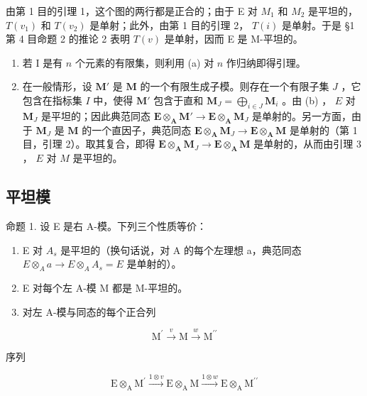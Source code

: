 由第 1 目的引理 1，这个图的两行都是正合的；由于 E 对 \(M_{1}\) 和 \(M_{2}\) 是平坦的， \(T(v_{1})\) 和 \(T(v_{2})\) 是单射；此外，由第 1 目的引理 2， \(T(i)\) 是单射。于是 §1 第 4 目命题 2 的推论 2 表明 \(T(v)\) 是单射，因而 E 是 M-平坦的。

\begin{enumerate}
\def\labelenumi{(\alph{enumi})}
\setcounter{enumi}{1}
\item
  若 I 是有 \(n\) 个元素的有限集，则利用 (a) 对 \(n\) 作归纳即得引理。
\item
  在一般情形，设 \(\mathbf{M}'\) 是 \(\mathbf{M}\) 的一个有限生成子模。则存在一个有限子集 \(J\) ，它包含在指标集 \(I\) 中，使得 \(\mathbf{M}'\) 包含于直和 \(\mathbf{M}_J = \bigoplus_{i \in J} \mathbf{M}_i\) 。由 (b) ， \(E\) 对 \(\mathbf{M}_J\) 是平坦的；因此典范同态 \(\mathbf{E} \otimes_{\mathbf{A}} \mathbf{M}' \to \mathbf{E} \otimes_{\mathbf{A}} \mathbf{M}_J\) 是单射的。另一方面，由于 \(\mathbf{M}_J\) 是 \(\mathbf{M}\) 的一个直因子，典范同态 \(\mathbf{E} \otimes_{\mathbf{A}} \mathbf{M}_J \to \mathbf{E} \otimes_{\mathbf{A}} \mathbf{M}\) 是单射的（第 1 目，引理 2）。取其复合，即得 \(\mathbf{E} \otimes_{\mathbf{A}} \mathbf{M}_J \to \mathbf{E} \otimes_{\mathbf{A}} \mathbf{M}\) 是单射的，从而由引理 3 ， \(E\) 对 \(M\) 是平坦的。
\end{enumerate}

\subsection{平坦模}

命题 1. 设 E 是右 A-模。下列三个性质等价：

\begin{enumerate}
\def\labelenumi{(\alph{enumi})}
\item
  E 对 \(A_{s}\) 是平坦的（换句话说，对 A 的每个左理想 a，典范同态 \(E \otimes_{A} a \to E \otimes_{A} A_{s} = E\) 是单射的）。
\item
  E 对每个左 A-模 M 都是 M-平坦的。
\item
  对左 A-模与同态的每个正合列
\end{enumerate}

\[
\mathrm{M} ^ {\prime} \xrightarrow {v} \mathrm{M} \xrightarrow {w} \mathrm{M} ^ {\prime \prime}
\]

序列

\[
\mathrm{E} \otimes_ {\mathrm{A}} \mathrm{M} ^ {\prime} \xrightarrow {1 \otimes v} \mathrm{E} \otimes_ {\mathrm{A}} \mathrm{M} \xrightarrow {1 \otimes w} \mathrm{E} \otimes_ {\mathrm{A}} \mathrm{M} ^ {\prime \prime}
\]

